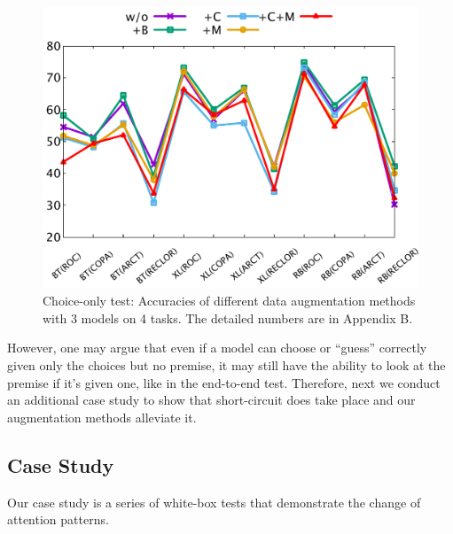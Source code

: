 %
\begin{figure}[th]
    \centering
    \includegraphics[width=0.7\columnwidth]{data/choice-only.pdf}
    \caption{Choice-only test: Accuracies of different data augmentation methods with 3 models on 4 tasks. 
    The detailed numbers are in Appendix B.}
    \label{fig:choice-only}
\end{figure}

However, one may argue that even if a model can 
choose or ``guess'' correctly given only the choices but no premise, 
it may still have the ability to look at the premise if it's given one,
like in the end-to-end test.
Therefore, next we conduct an additional case study to show that short-circuit
does take place and our augmentation methods alleviate it.

\subsection{Case Study}
\label{sec:case}
Our case study is a series of white-box tests that demonstrate
the change of attention patterns.


